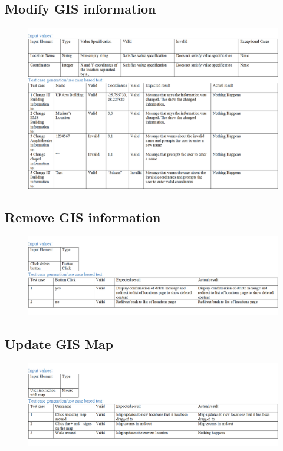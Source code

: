 \documentclass[english]{article}
\begin{document}
\subsection{Modify GIS information}
\begin{figure}[H]
\label{tab:example}
\hspace*{-2.5cm} 
\includegraphics[width=180mm]{ModifyGISInformation.png}
\end{figure}
\subsection{Remove GIS information}
\begin{figure}[ht!]
\hspace*{-2.5cm} 
\includegraphics[width=180mm]{DeleteGISInformation.png}
\end{figure}
\subsection{Update GIS Map}
\begin{figure}[H]
\hspace*{-2.5cm} 
\includegraphics[width=180mm]{UpdateGISMap.png}
\end{figure}
\end{document}
